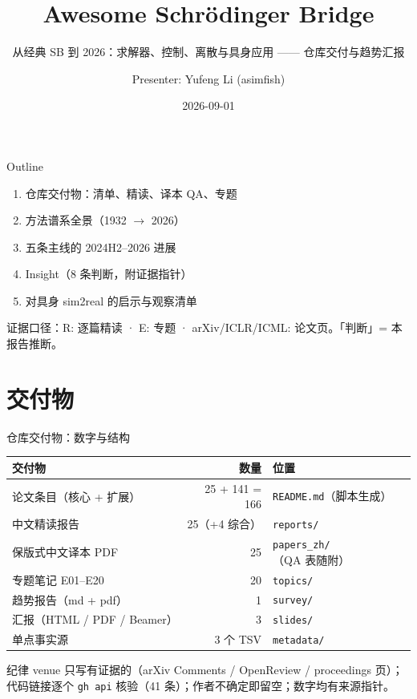 \documentclass[aspectratio=169,10pt]{beamer}
\title[Awesome Schrödinger Bridge]{Awesome Schrödinger Bridge}
\subtitle{从经典 SB 到 2026：求解器、控制、离散与具身应用 —— 仓库交付与趋势汇报}
\author{Presenter: Yufeng Li (asimfish)}
\institute{github.com/asimfish/awesome\_Schrodinger\_Bridge}
\date{2026-09-01}
\begin{document}
\begin{frame}\titlepage\end{frame}

\begin{frame}{Outline}
\begin{enumerate}
\item 仓库交付物：清单、精读、译本 QA、专题
\item 方法谱系全景（1932 $\to$ 2026）
\item 五条主线的 2024H2--2026 进展
\item Insight（8 条判断，附证据指针）
\item 对具身 sim2real 的启示与观察清单
\end{enumerate}
\vspace{6pt}
\textcolor{neutral}{证据口径：R: 逐篇精读 · E: 专题 · arXiv/ICLR/ICML: 论文页。「判断」= 本报告推断。}
\end{frame}

\section{交付物}
\begin{frame}{仓库交付物：数字与结构}
\vspace{4pt}
\begin{center}\begin{tabular}{lrl}\toprule
交付物 & 数量 & 位置 \\\midrule
论文条目（核心 + 扩展） & 25 + 141 = 166 & \texttt{README.md}（脚本生成） \\
中文精读报告 & 25（+4 综合） & \texttt{reports/} \\
保版式中文译本 PDF & 25 & \texttt{papers\_zh/}（QA 表随附） \\
专题笔记 E01--E20 & 20 & \texttt{topics/} \\
趋势报告（md + pdf） & 1 & \texttt{survey/} \\
汇报（HTML / PDF / Beamer） & 3 & \texttt{slides/} \\
单点事实源 & 3 个 TSV & \texttt{metadata/} \\\bottomrule
\end{tabular}\end{center}
\vspace{4pt}
\begin{block}{纪律}
venue 只写有证据的（arXiv Comments / OpenReview / proceedings 页）；代码链接逐个 \texttt{gh api} 核验（41 条）；作者不确定即留空；数字均有来源指针。
\end{block}
\end{frame}
\end{document}
